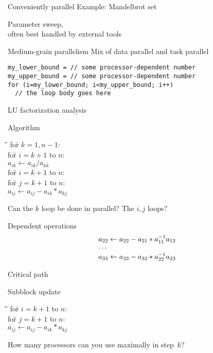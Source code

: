 \begin{numberedframe}{Conveniently parallel}
  Example: Mandelbrot set

  Parameter sweep,\\
  often best handled by external tools
\end{numberedframe}

\begin{numberedframe}{Medium-grain parallelism}
Mix of data parallel and task parallel
\begin{lstlisting}
my_lower_bound = // some processor-dependent number
my_upper_bound = // some processor-dependent number
for (i=my_lower_bound; i<my_upper_bound; i++)
  // the loop body goes here
\end{lstlisting}
\end{numberedframe}

 {LU factorization analysis}

\begin{numberedframe}{Algorithm}
  \begin{tabbing}
    \kern10pt\=\kern10pt\=\kern10pt\=\kill
    for\={} $k=1,n-1$:\\
    \>for\={} $i=k+1$ to $n$:\\
    \>\> $a_{ik}\leftarrow a_{ik}/a_{kk}$\\
    \>for\={} $i=k+1$ to $n$:\\
    \>\>for\={} $j=k+1$ to $n$:\\
    \>\>\>$a_{ij}\leftarrow a_{ij}-a_{ik}*a_{kj}$
  \end{tabbing}

  Can the $k$ loop be done in parallel? The $i,j$ loops?
\end{numberedframe}

\begin{numberedframe}{Dependent operations}
\[ 
\begin{array}{l}
  a_{22} \leftarrow a_{22} - a_{21}*a_{11}^{-1} a_{12}\\
  \cdots\\
  a_{33} \leftarrow a_{33} - a_{32}*a_{22}^{-1} a_{23}\\
\end{array}
\]
\end{numberedframe}

\begin{exercise}{Critical path}
  
\end{exercise}

\begin{numberedframe}{Subblock update}
\begin{tabbing}
  \kern20pt\=\kern10pt\=\kern10pt\=\kern10pt\=\kill
  for\={} $i=k+1$ to $n$:\\
  \>for\={} $j=k+1$ to $n$:\\
  \>\>$a_{ij}\leftarrow a_{ij}-a_{ik}*a_{kj}$
\end{tabbing}
  
How many processors can you use maximally in step~$k$?
\end{numberedframe}

